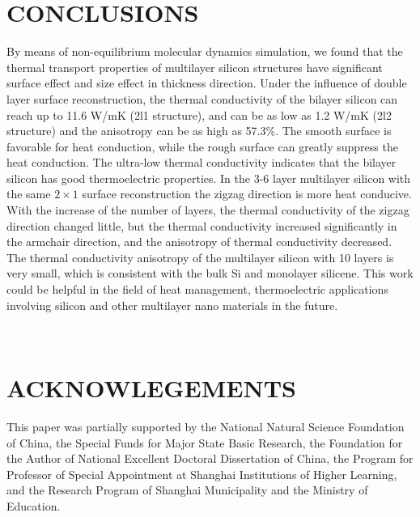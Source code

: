 \documentclass[%
 reprint,
 amsmath,amssymb,
 aps,
 prb,
]{revtex4-1}
\begin{document}
\section{CONCLUSIONS}

By means of non-equilibrium molecular dynamics simulation, we found that the thermal transport properties of multilayer silicon structures have significant surface effect and size effect in thickness direction. Under the influence of double layer surface reconstruction, the thermal conductivity of the bilayer silicon can reach up to 11.6 W/mK (2l1 structure), and can be as low as 1.2 W/mK (2l2 structure) and the anisotropy can be as high as 57.3\%. The smooth surface is favorable for heat conduction, while the rough surface can greatly suppress the heat conduction. The ultra-low thermal conductivity indicates that the bilayer silicon has good thermoelectric properties. In the 3-6 layer multilayer silicon with the same $2 \times 1$ surface reconstruction the zigzag direction is more heat conducive. With the increase of the number of layers, the thermal conductivity of the zigzag direction changed little, but the thermal conductivity increased significantly in the armchair direction, and the anisotropy of thermal conductivity decreased. The thermal conductivity anisotropy of the multilayer silicon with 10 layers is very small, which is consistent with the bulk Si and monolayer silicene. This work could be helpful in the field of heat management, thermoelectric applications involving silicon and other multilayer nano materials in the future.

\quad \\
\section{ACKNOWLEGEMENTS}
This paper was partially supported by the National Natural Science Foundation of China, the Special Funds for Major State Basic Research, the Foundation for the Author of National Excellent Doctoral Dissertation of China, the Program for Professor of Special Appointment at Shanghai Institutions of Higher Learning, and the Research Program of Shanghai Municipality and the Ministry of Education.



\end{document}
